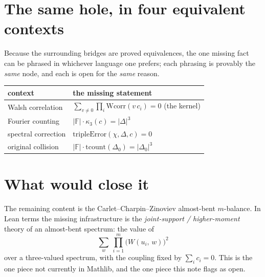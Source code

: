 \documentclass[11pt]{article}
\begin{document}
\section{The same hole, in four equivalent contexts}

\noindent
Because the surrounding bridges are proved equivalences, the one missing fact
can be phrased in whichever language one prefers; each phrasing is provably the
\emph{same} node, and each is open for the \emph{same} reason.

\begin{center}
\renewcommand{\arraystretch}{1.7}
\begin{tabular}{l l}
\textbf{context} & \textbf{the missing statement} \\
\hline
Walsh correlation & $\displaystyle\sum_{v\neq0}\prod_i \mathrm{Wcorr}(v\,c_i)=0$ \quad (the kernel) \\
Fourier counting  & $|\mathbb{F}|\cdot\kappa_3(c) = |\Delta|^3$ \\
spectral correction & $\mathrm{tripleError}(\chi,\Delta,c)=0$ \\
original collision & $|\mathbb{F}|\cdot\mathrm{tcount}(\Delta_0) = |\Delta_0|^3$ \\
\end{tabular}
\end{center}


\bigskip

\section*{What would close it}

\noindent
The remaining content is the Carlet--Charpin--Zinoviev almost-bent
$m$-balance.  In Lean terms the missing infrastructure is the
\emph{joint-support / higher-moment} theory of an almost-bent spectrum:
the value of
\[
  \sum_{w}\ \prod_{i=1}^{m}\bigl(W(u_i,\,w)\bigr)^2
\]
over a three-valued spectrum, with the coupling fixed by $\sum_i c_i = 0$.
This is the one piece not currently in Mathlib, and the one piece this note
flags as open.
\end{document}
